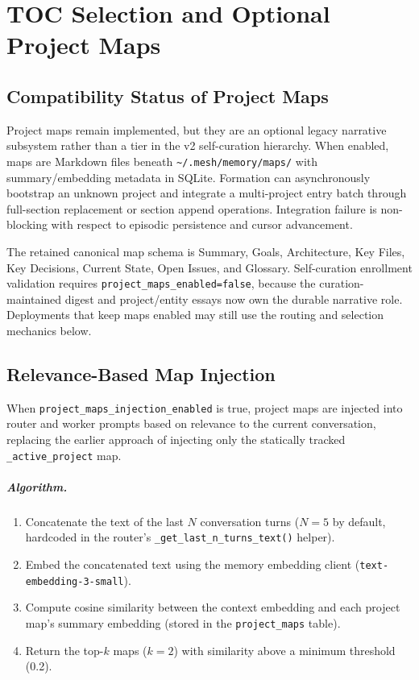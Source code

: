 \documentclass[11pt,letterpaper]{report}
\newcommand{\code}[1]{\texttt{#1}}
\begin{document}
\chapter{TOC Selection and Optional Project Maps}
\label{ch:maps-toc}

\section{Compatibility Status of Project Maps}

Project maps remain implemented, but they are an optional legacy narrative
subsystem rather than a tier in the v2 self-curation hierarchy. When enabled,
maps are Markdown files beneath
\code{\textasciitilde/.mesh/memory/maps/} with summary/embedding metadata in
SQLite. Formation can asynchronously bootstrap an unknown project and
integrate a multi-project entry batch through full-section replacement or
section append operations. Integration failure is non-blocking with respect
to episodic persistence and cursor advancement.

The retained canonical map schema is Summary, Goals, Architecture, Key Files,
Key Decisions, Current State, Open Issues, and Glossary. Self-curation
enrollment validation requires \code{project\_maps\_enabled=false}, because
the curation-maintained digest and project/entity essays now own the durable
narrative role. Deployments that keep maps enabled may still use the routing
and selection mechanics below.

\section{Relevance-Based Map Injection}
\label{sec:map-injection}

When \code{project\_maps\_injection\_enabled} is true, project maps are
injected into router and worker prompts based on relevance to the current
conversation, replacing the earlier approach of injecting only the
statically tracked \code{\_active\_project} map.

\paragraph{Algorithm.}
\begin{enumerate}[nosep]
  \item Concatenate the text of the last $N$ conversation turns
        ($N{=}5$ by default, hardcoded in the router's
        \code{\_get\_last\_n\_turns\_text()} helper).
  \item Embed the concatenated text using the memory embedding client
        (\code{text-embedding-3-small}).
  \item Compute cosine similarity between the context embedding and each
        project map's summary embedding (stored in the
        \code{project\_maps} table).
  \item Return the top-$k$ maps ($k{=}2$) with similarity above a
        minimum threshold (0.2).
\end{enumerate}
\end{document}
